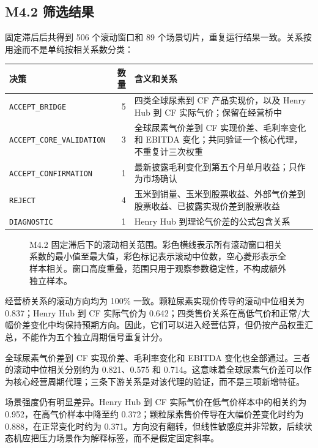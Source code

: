 \documentclass[11pt,a4paper]{ctexart}
\begin{document}
\subsection{M4.2 筛选结果}

固定滞后后共得到 506 个滚动窗口和 89 个场景切片，重复运行结果一致。关系按用途而不是单纯按相关系数分类：

\begin{center}
\small
\begin{tabularx}{\textwidth}{L{3.4cm}r Y}
\toprule
决策 & 数量 & 含义和关系 \\
\midrule
\texttt{ACCEPT\_BRIDGE} & 5 & 四类全球尿素到 CF 产品实现价，以及 Henry Hub 到 CF 实际气价；保留在经营桥中 \\
\texttt{ACCEPT\_CORE\_VALIDATION} & 3 & 全球尿素气价差到 CF 实现价差、毛利率变化和 EBITDA 变化；共同验证一个核心代理，不重复计三次权重 \\
\texttt{ACCEPT\_CONFIRMATION} & 1 & 最新披露毛利变化到第五个月单月收益；只作为市场确认 \\
\texttt{REJECT} & 4 & 玉米到销量、玉米到股票收益、外部气价差到股票收益、已披露实现价差到股票收益 \\
\texttt{DIAGNOSTIC} & 1 & Henry Hub 到理论气价差的公式包含关系 \\
\bottomrule
\end{tabularx}
\normalsize
\end{center}

\begin{figure}[htbp]
\centering

\caption{M4.2 固定滞后下的滚动相关范围。彩色横线表示所有滚动窗口相关系数的最小值至最大值，彩色标记表示滚动中位数，空心菱形表示全样本相关。窗口高度重叠，范围只用于观察参数稳定性，不构成额外独立样本。}
\label{fig:cf-lead-lag-rolling-stability}
\end{figure}

经营桥关系的滚动方向均为 100\% 一致。颗粒尿素实现价传导的滚动中位相关为 0.837；Henry Hub 到 CF 实际气价为 0.642；四类售价关系在高低气价和正常/大幅价差变化中均保持预期方向。因此，它们可以进入经营估算，但仍按产品权重汇总，不能作为五个独立周期信号重复计分。

全球尿素气价差到 CF 实现价差、毛利率变化和 EBITDA 变化也全部通过。三者的滚动中位相关分别约为 0.821、0.575 和 0.714。这意味着全球尿素气价差可以作为核心经营周期代理；三条下游关系是对该代理的验证，而不是三项新增特征。

场景强度仍有明显差异。Henry Hub 到 CF 实际气价在低气价样本中的相关约为 0.952，在高气价样本中降至约 0.372；颗粒尿素售价传导在大幅价差变化时约为 0.888，在正常变化时约为 0.371。方向没有翻转，但线性敏感度并非常数，后续状态机应把压力场景作为解释标签，而不是假定固定斜率。
\end{document}

